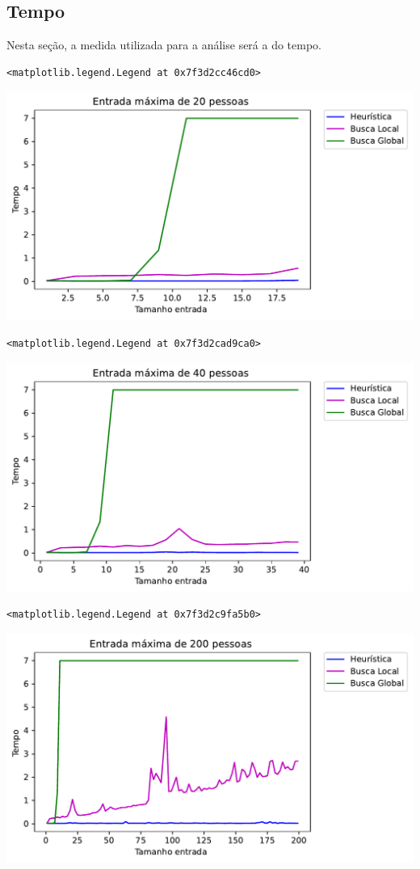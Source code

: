 \documentclass[a4paper,11pt,final]{article}
\begin{document}
\subsection{Tempo}

Nesta seção, a medida utilizada para a análise será a do tempo.





\begin{verbatim}
<matplotlib.legend.Legend at 0x7f3d2cc46cd0>
\end{verbatim}
\includegraphics[width= 15 cm]{figures/teste_figure3_1.pdf}


\begin{verbatim}
<matplotlib.legend.Legend at 0x7f3d2cad9ca0>
\end{verbatim}
\includegraphics[width= 15 cm]{figures/teste_figure4_1.pdf}



\begin{verbatim}
<matplotlib.legend.Legend at 0x7f3d2c9fa5b0>
\end{verbatim}
\includegraphics[width= 15 cm]{figures/teste_figure5_1.pdf}
\end{document}
